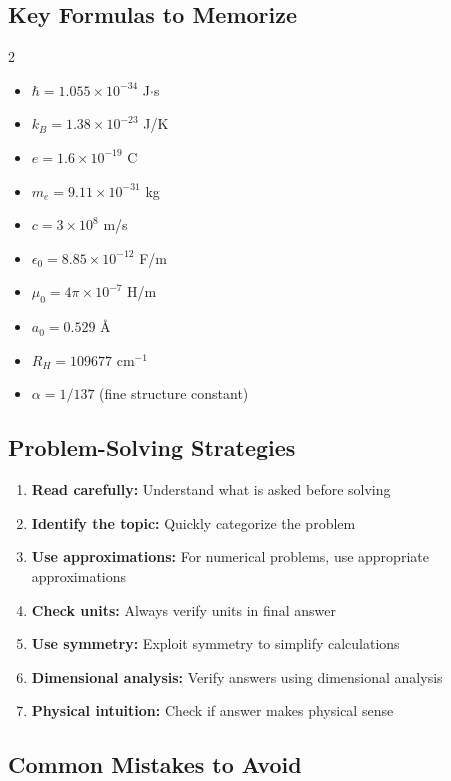 \documentclass[12pt,a4paper]{article}
\begin{document}
\subsection{Key Formulas to Memorize}

\begin{multicols}{2}
\begin{itemize}
\item $\hbar = 1.055 \times 10^{-34}$ J$\cdot$s
\item $k_B = 1.38 \times 10^{-23}$ J/K
\item $e = 1.6 \times 10^{-19}$ C
\item $m_e = 9.11 \times 10^{-31}$ kg
\item $c = 3 \times 10^8$ m/s
\item $\epsilon_0 = 8.85 \times 10^{-12}$ F/m
\item $\mu_0 = 4\pi \times 10^{-7}$ H/m
\item $a_0 = 0.529$ Å
\item $R_H = 109677$ cm$^{-1}$
\item $\alpha = 1/137$ (fine structure constant)
\end{itemize}
\end{multicols}

\subsection{Problem-Solving Strategies}

\begin{enumerate}
\item \textbf{Read carefully:} Understand what is asked before solving
\item \textbf{Identify the topic:} Quickly categorize the problem
\item \textbf{Use approximations:} For numerical problems, use appropriate approximations
\item \textbf{Check units:} Always verify units in final answer
\item \textbf{Use symmetry:} Exploit symmetry to simplify calculations
\item \textbf{Dimensional analysis:} Verify answers using dimensional analysis
\item \textbf{Physical intuition:} Check if answer makes physical sense
\end{enumerate}

\subsection{Common Mistakes to Avoid}
\end{document}
